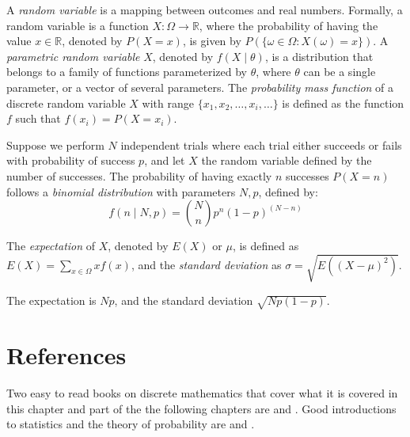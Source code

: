 A \emph{random variable} is a mapping between outcomes and real numbers. Formally, a random variable is a function $X : \Omega \rightarrow \mathbb{R}$, where the probability of having the value $x \in \mathbb{R}$, denoted by $P(X=x)$, is given by $P(\{ \omega \in \Omega : X(\omega) = x\})$. A \emph{parametric random variable} $X$, denoted by $f\left(X \mid \theta \right)$, is a distribution that belongs to a family of functions parameterized by $\theta$, where $\theta$ can be a single parameter, or a vector of several parameters. The \emph{probability mass function} of a discrete random variable $X$ with range $\{ x_1, x_2, \ldots, x_i, \ldots \}$ is defined as the function $f$ such that $f(x_i) = P(X=x_i)$.

\begin{example}
Suppose we perform $N$ independent trials where each trial either succeeds or fails with probability of success $p$, and let $X$ the random variable defined by the number of successes. The probability of having exactly $n$ successes $P(X=n)$ follows a \emph{binomial distribution} with parameters $N, p$, defined by:
\[
f(n\mid N, p) = \binom{N}{n} p^n (1-p)^{(N-n)}
\]
\end{example}

The \emph{expectation} of $X$, denoted by $E(X)$ or $\mu$, is defined as $E(X) = \sum_{x \in \Omega} x f(x)$, and the \emph{standard deviation} as $\sigma = \sqrt{E \left( (X - \mu)^2 \right)}$.

\begin{example}
The expectation is $Np$, and the standard deviation $\sqrt{Np(1-p)}$.
\end{example}



\section*{References}

Two easy to read books on discrete mathematics that cover what it is covered in this chapter and part of the the following chapters are \cite{rosen1995discrete} and \cite{epp2010discrete}. Good introductions to statistics and the theory of probability are \cite{degroot1986probability} and \cite{spiegel2012probability}.
